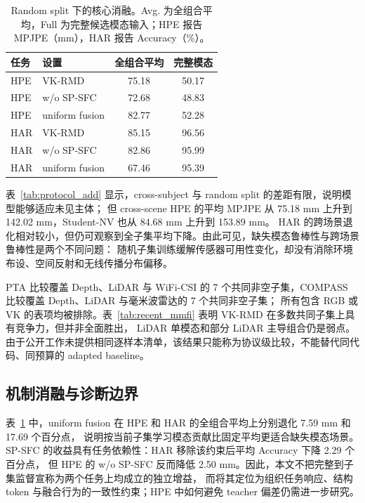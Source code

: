 \documentclass[journal]{IEEEtran}
\begin{document}
\begin{table}[H]
\centering
\caption{Random split 下的核心消融。Avg. 为全组合平均，Full 为完整候选模态输入；HPE 报告 MPJPE（mm），HAR 报告 Accuracy（\%）。}
\label{tab:ablation_add}
\footnotesize
\begin{tabular}{llcc}
\toprule
任务 & 设置 & 全组合平均 & 完整模态 \\
\midrule
HPE & VK-RMD & 75.18 & 50.17 \\
HPE & w/o SP-SFC & 72.68 & 48.83 \\
HPE & uniform fusion & 82.77 & 52.28 \\
HAR & VK-RMD & 85.15 & 96.56 \\
HAR & w/o SP-SFC & 82.86 & 95.99 \\
HAR & uniform fusion & 67.46 & 95.39 \\
\bottomrule
\end{tabular}
\end{table}

表~\ref{tab:protocol_add} 显示，cross-subject 与 random split 的差距有限，说明模型能够适应未见主体；
但 cross-scene HPE 的平均 MPJPE 从 75.18 mm 上升到 142.02 mm，Student-NV 也从 84.68 mm 上升到 153.89 mm。
HAR 的跨场景退化相对较小，但仍可观察到全子集平均下降。由此可见，缺失模态鲁棒性与跨场景鲁棒性是两个不同问题：
随机子集训练缓解传感器可用性变化，却没有消除环境布设、空间反射和无线传播分布偏移。

PTA 比较覆盖 Depth、LiDAR 与 WiFi-CSI 的 7 个共同非空子集，COMPASS 比较覆盖 Depth、LiDAR 与毫米波雷达的 7 个共同非空子集；
所有包含 RGB 或 VK 的表项均被排除。表~\ref{tab:recent_mmfi} 表明 VK-RMD 在多数共同子集上具有竞争力，但并非全面胜出，
LiDAR 单模态和部分 LiDAR 主导组合仍是弱点。由于公开工作未提供相同逐样本清单，该结果只能称为协议级比较，不能替代同代码、同预算的 adapted baseline。

\subsection{机制消融与诊断边界}

表~\ref{tab:ablation_add} 中，uniform fusion 在 HPE 和 HAR 的全组合平均上分别退化 7.59 mm 和 17.69 个百分点，
说明按当前子集学习模态贡献比固定平均更适合缺失模态场景。SP-SFC 的收益具有任务依赖性：HAR 移除该约束后平均 Accuracy 下降 2.29 个百分点，
但 HPE 的 w/o SP-SFC 反而降低 2.50 mm。因此，本文不把完整到子集监督宣称为两个任务上均成立的独立增益，
而将其定位为组织任务响应、结构 token 与融合行为的一致性约束；HPE 中如何避免 teacher 偏差仍需进一步研究。
\end{document}
